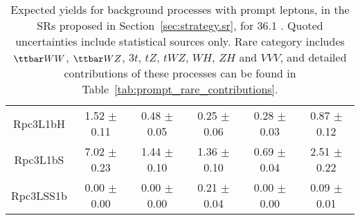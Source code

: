 \begin{table}[!htb]
{\begin{tabular}{|c|c|c|c|c|c|}
 Rpc3L1bH  &     1.52 $\pm$ 0.11   &     0.48 $\pm$ 0.05  &     0.25 $\pm$ 0.06  &     0.28 $\pm$ 0.03    &     0.87 $\pm$ 0.12  \\
 Rpc3L1bS  &     7.02 $\pm$ 0.23   &     1.44 $\pm$ 0.10  &     1.36 $\pm$ 0.10  &     0.69 $\pm$ 0.04    &     2.51 $\pm$ 0.22  \\
 Rpc3LSS1b  &     0.00 $\pm$ 0.00   &     0.00 $\pm$ 0.00  &     0.21 $\pm$ 0.04  &     0.00 $\pm$ 0.00    &     0.09 $\pm$ 0.01  \\
\hline\hline
\end{tabular}}
\caption{Expected yields for background processes with prompt leptons, 
in the SRs proposed in Section~\ref{sec:strategy.sr}, for 36.1 \ifb. 
Quoted uncertainties include statistical sources only. %
Rare category includes $\ttbar WW$, $\ttbar WZ$, 3$t$, $tZ$, $tWZ$, $WH$, $ZH$ and $VVV$, and detailed contributions of these processes can be found in Table~\ref{tab:prompt_rare_contributions}. 
}
\label{tab:prompt_sr_yields}
\end{table}


\begin{table}[!htb]
\def\arraystretch{1.1}
\centering
{}
\caption{Contributions of particular rare processes to the signal regions, relative to the summed contributions of all these processes.  
}
\label{tab:prompt_rare_contributions}
\end{table}



